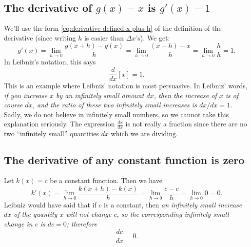 

\subsection{The derivative of $g(x) = x$ is $g'(x) =1$} 
\label{ex:derivative-of-a-constant}
We'll use the form \eqref{eq:derivative-defined-x-plus-h} of the
definition of the derivative (since writing $h$ is easier than
$\Delta x$'s).  We get:
\[
g'(x)= \lim_{h\to 0} \frac{g(x+h)-g(x)}{h}
= \lim_{h\to 0} \frac{(x+h) -x}{h}=\lim_{h\to 0} \frac{h}{h} =1.
\]
In Leibniz's notation, this says
\[
\frac{d}{dx}\left[x\right] = 1.
\]
This is an example where Leibniz' notation is most persuasive.  In
Leibniz' words, \textit{if you increase $x$ by an infinitely small
  amount $dx$, then the increase of $x$ is of course $dx$, and the
  ratio of these two infinitely small increases is $dx/dx = 1$.}
Sadly, we do not believe in infinitely small numbers, so we cannot
take this explanation seriously.  The expression $\frac{dx}{dx}$ is
not really a fraction since there are no two ``infinitely small''
quantities $dx$ which we are dividing.

\subsection{The derivative of any constant function is zero} 
Let $k(x)=c$ be a constant function.  Then we have
\[
k'(x)= \lim_{h\to 0} \frac{k(x+h)-k(x)}{h}
= \lim_{h\to 0} \frac{c-c}{h}=\lim_{h\to 0} 0 =0.
\]
Leibniz would have said that if $c$ is a constant, then \textit{an
  infinitely small increase $dx$ of the quantity $x$ will not change
  $c$, so the corresponding infinitely small change in $c$ is $dc=0$;
  therefore}
\[
\frac{dc}{dx} = 0.
\]




